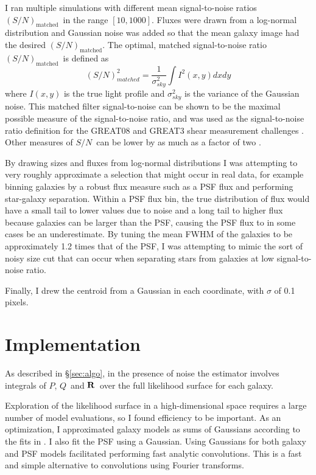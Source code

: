 \documentclass[usegraphicx,usenatbib]{mn2e}
\newcommand{\sn}{$S/N$}
\newcommand{\Msn}{$(S/N)_{\textrm{matched}}$}
\newcommand{\vecQ}{\mbox{\boldmath $Q$}}
\newcommand{\matR}{\mbox{$\bf R$}}
\begin{document}
I ran multiple simulations with different mean signal-to-noise ratios \Msn\ in the
range $[10,1000]$.  Fluxes were drawn from a log-normal distribution and
Gaussian noise was added so that the mean galaxy image had the desired 
\Msn.  The optimal, matched signal-to-noise ratio \Msn\ is defined as
\begin{equation}
    (S/N)^2_{matched} = \frac{1}{\sigma^2_{sky}} \int I^2(x,y) dx dy
\end{equation}
where $I(x,y)$ is the true light profile and $\sigma_{sky}^2$ is the variance
of the Gaussian noise.  This matched filter signal-to-noise can be shown to be
the maximal possible measure of the signal-to-noise ratio, and was used as the
signal-to-noise ratio definition for the GREAT08 and GREAT3 shear measurement
challenges \citep{BridleGREAT08,great3}.  Other measures of \sn\ can be lower
by as much as a factor of two \citep{great3}.

By drawing sizes and fluxes from log-normal distributions I was attempting to
very roughly approximate a selection that might occur in real data, for example
binning galaxies by a robust flux measure such as a PSF flux and performing
star-galaxy separation.  Within a PSF flux bin, the true distribution of flux
would have a small tail to lower values due to noise and a long tail to higher
flux because galaxies can be larger than the PSF, causing the PSF flux to in
some cases be an underestimate.  By tuning the mean FWHM of the galaxies to be
approximately 1.2 times that of the PSF, I was attempting to mimic the sort of
noisy size cut that can occur when separating stars from galaxies at low
signal-to-noise ratio.

Finally, I drew the centroid from a Gaussian in each coordinate, with $\sigma$
of 0.1 pixels.  


\section{Implementation} \label{sec:impl}

As described in \S \ref{sec:algo}, in the presence of noise the estimator
involves integrals of $P$, \vecQ\ and \matR\ over the full likelihood surface
for each galaxy.

Exploration of the likelihood surface in a high-dimensional space requires a
large number of model evaluations, so I found efficiency to be important.  As
an optimization, I approximated galaxy models as sums of Gaussians according to
the fits in \citet{HoggGMix}.  I also fit the PSF using a Gaussian.  Using
Gaussians for both galaxy and PSF models facilitated performing fast analytic
convolutions.  This is a fast and simple alternative to convolutions using
Fourier transforms.
\end{document}
